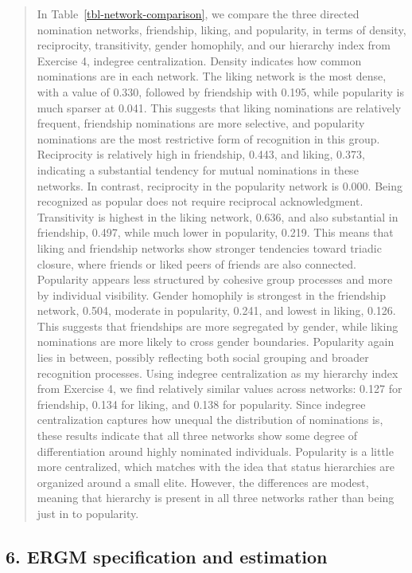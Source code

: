 \documentclass[
  letterpaper,
  DIV=11,
  numbers=noendperiod]{scrartcl}
\begin{document}
\begin{quote}
In Table~\ref{tbl-network-comparison}, we compare the three directed
nomination networks, friendship, liking, and popularity, in terms of
density, reciprocity, transitivity, gender homophily, and our hierarchy
index from Exercise 4, indegree centralization. Density indicates how
common nominations are in each network. The liking network is the most
dense, with a value of 0.330, followed by friendship with 0.195, while
popularity is much sparser at 0.041. This suggests that liking
nominations are relatively frequent, friendship nominations are more
selective, and popularity nominations are the most restrictive form of
recognition in this group. Reciprocity is relatively high in friendship,
0.443, and liking, 0.373, indicating a substantial tendency for mutual
nominations in these networks. In contrast, reciprocity in the
popularity network is 0.000. Being recognized as popular does not
require reciprocal acknowledgment. Transitivity is highest in the liking
network, 0.636, and also substantial in friendship, 0.497, while much
lower in popularity, 0.219. This means that liking and friendship
networks show stronger tendencies toward triadic closure, where friends
or liked peers of friends are also connected. Popularity appears less
structured by cohesive group processes and more by individual
visibility. Gender homophily is strongest in the friendship network,
0.504, moderate in popularity, 0.241, and lowest in liking, 0.126. This
suggests that friendships are more segregated by gender, while liking
nominations are more likely to cross gender boundaries. Popularity again
lies in between, possibly reflecting both social grouping and broader
recognition processes. Using indegree centralization as my hierarchy
index from Exercise 4, we find relatively similar values across
networks: 0.127 for friendship, 0.134 for liking, and 0.138 for
popularity. Since indegree centralization captures how unequal the
distribution of nominations is, these results indicate that all three
networks show some degree of differentiation around highly nominated
individuals. Popularity is a little more centralized, which matches with
the idea that status hierarchies are organized around a small elite.
However, the differences are modest, meaning that hierarchy is present
in all three networks rather than being just in to popularity.
\end{quote}

\subsection{6. ERGM specification and
estimation}\label{ergm-specification-and-estimation}
\end{document}

